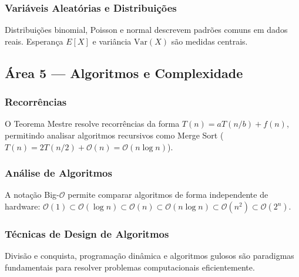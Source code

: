 \documentclass[12pt, a4paper]{article}
\begin{document}
\subsubsection*{Variáveis Aleatórias e Distribuições}
Distribuições binomial, Poisson e normal descrevem padrões comuns em dados reais. Esperança
$E[X]$ e variância $\text{Var}(X)$ são medidas centrais.

\subsection*{Área 5 --- Algoritmos e Complexidade}

\subsubsection*{Recorrências}
O Teorema Mestre resolve recorrências da forma $T(n) = aT(n/b) + f(n)$, permitindo analisar
algoritmos recursivos como Merge Sort
($T(n) = 2T(n/2) + \mathcal{O}(n) = \mathcal{O}(n \log n)$).

\subsubsection*{Análise de Algoritmos}
A notação Big-$\mathcal{O}$ permite comparar algoritmos de forma independente de hardware:
$\mathcal{O}(1) \subset \mathcal{O}(\log n) \subset \mathcal{O}(n) \subset
\mathcal{O}(n \log n) \subset \mathcal{O}(n^2) \subset \mathcal{O}(2^n)$.

\subsubsection*{Técnicas de Design de Algoritmos}
Divisão e conquista, programação dinâmica e algoritmos gulosos são paradigmas fundamentais
para resolver problemas computacionais eficientemente.
\end{document}
